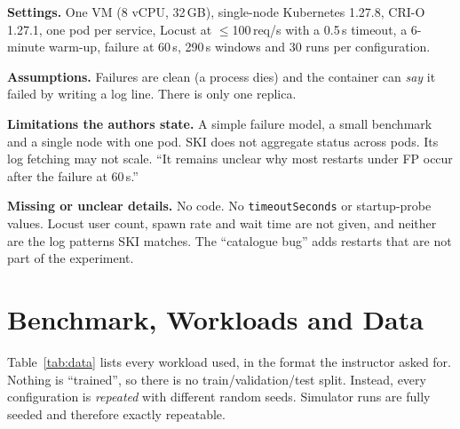 \documentclass[conference]{IEEEtran}
\begin{document}
\textbf{Settings.} One VM (8 vCPU, 32\,GB), single-node Kubernetes
1.27.8, CRI-O 1.27.1, one pod per service, Locust at $\le$100\,req/s
with a 0.5\,s timeout, a 6-minute warm-up, failure at 60\,s, 290\,s
windows and 30 runs per configuration.

\textbf{Assumptions.} Failures are clean (a process dies) and the
container can \emph{say} it failed by writing a log line. There is only
one replica.

\textbf{Limitations the authors state.} A simple failure model, a small
benchmark and a single node with one pod. SKI does not aggregate status
across pods. Its log fetching may not scale. ``It remains unclear why
most restarts under FP occur after the failure at 60\,s.''

\textbf{Missing or unclear details.} No code. No \texttt{timeoutSeconds}
or startup-probe values. Locust user count, spawn rate and wait time
are not given, and neither are the log patterns SKI matches. The
``catalogue bug'' adds restarts that are not part of the experiment.

\section{Benchmark, Workloads and Data}
\label{sec:data}
Table~\ref{tab:data} lists every workload used, in the format the
instructor asked for. Nothing is ``trained'', so there is no
train/validation/test split. Instead, every configuration is
\emph{repeated} with different random seeds. Simulator runs are fully
seeded and therefore exactly repeatable.
\end{document}
